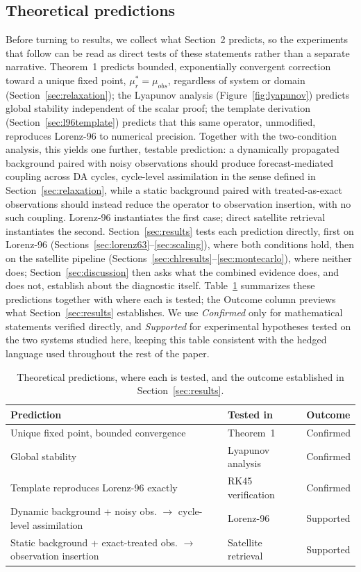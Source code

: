 \documentclass[final,5p,times,twocolumn,authoryear]{elsarticle}
\begin{document}
\subsection{Theoretical predictions}
\label{sec:predictions}

Before turning to results, we collect what Section~2 predicts, so the
experiments that follow can be read as direct tests of these
statements rather than a separate narrative. Theorem~1 predicts
bounded, exponentially convergent correction toward a unique fixed
point, $\mu_r^\ast=\mu_{obs}$, regardless of system or domain
(Section~\ref{sec:relaxation}); the Lyapunov analysis
(Figure~\ref{fig:lyapunov}) predicts global stability independent of
the scalar proof; the template derivation
(Section~\ref{sec:l96template}) predicts that this same operator,
unmodified, reproduces Lorenz-96 to numerical precision. Together
with the two-condition analysis, this yields one further, testable
prediction: a dynamically propagated background paired with noisy
observations should produce forecast-mediated coupling across DA
cycles, cycle-level assimilation in the sense defined in
Section~\ref{sec:relaxation}, while a static background paired with
treated-as-exact observations should instead reduce the operator to
observation insertion, with no such coupling. Lorenz-96 instantiates
the first case; direct satellite retrieval instantiates the second.
Section~\ref{sec:results} tests each prediction directly, first on
Lorenz-96 (Sections~\ref{sec:lorenz63}--\ref{sec:scaling}), where
both conditions hold, then on the satellite pipeline
(Sections~\ref{sec:chlresults}--\ref{sec:montecarlo}), where neither
does; Section~\ref{sec:discussion} then asks what the combined
evidence does, and does not, establish about the diagnostic itself.
Table~\ref{tab:predictions} summarizes these predictions together
with where each is tested; the Outcome column previews what
Section~\ref{sec:results} establishes. We use \emph{Confirmed} only
for mathematical statements verified directly, and \emph{Supported}
for experimental hypotheses tested on the two systems studied here,
keeping this table consistent with the hedged language used
throughout the rest of the paper.

\begin{table}[t]
\centering
\small
\caption{Theoretical predictions, where each is tested, and the
outcome established in Section~\ref{sec:results}.}
\label{tab:predictions}
\begin{tabular}{p{3.4cm}p{1.9cm}p{1.1cm}}
\toprule
Prediction & Tested in & Outcome \\
\midrule
Unique fixed point, bounded convergence & Theorem~1 & Confirmed \\
Global stability & Lyapunov analysis & Confirmed \\
Template reproduces Lorenz-96 exactly & RK45 verification & Confirmed \\
Dynamic background + noisy obs. $\to$ cycle-level assimilation & Lorenz-96 & Supported \\
Static background + exact-treated obs. $\to$ observation insertion & Satellite retrieval & Supported \\
\bottomrule
\end{tabular}
\end{table}
\end{document}
